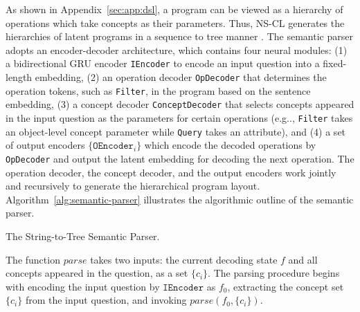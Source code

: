 \documentclass{article} %
\makeatletter
\DeclareRobustCommand\onedot{\futurelet\@let@token\@onedot}
\def\@onedot{\ifx\@let@token.\else.\null\fi\xspace}
\def\eg{e.g\onedot} \def\Eg{E.g\onedot}
\newcommand{\model}{NS-CL\xspace}
\makeatother
\begin{document}
As shown in Appendix~\ref{sec:app:dsl}, a program can be viewed as a hierarchy of operations which take concepts as their parameters. Thus, \model generates the hierarchies of latent programs in a sequence to tree manner \citep{Dong2016Language}. The semantic parser adopts an encoder-decoder architecture, which contains four neural modules: (1) a bidirectional GRU encoder {\tt IEncoder} \citep{Cho2014Learning} to encode an input question into a fixed-length embedding, (2) an operation decoder {\tt OpDecoder} that determines the operation tokens, such as {\tt Filter}, in the program based on the sentence embedding, (3) a concept decoder {\tt ConceptDecoder} that selects concepts appeared in the input question as the parameters for certain operations (\eg, {\tt Filter} takes an object-level concept parameter while {\tt Query} takes an attribute), and (4) a set of output encoders $\{\texttt{OEncoder}_i\}$ which encode the decoded operations by {\tt OpDecoder} and output the latent embedding for decoding the next operation. The operation decoder, the concept decoder, and the output encoders work jointly and recursively to generate the hierarchical program layout. Algorithm~\ref{alg:semantic-parser} illustrates the algorithmic outline of the semantic parser.

\begin{algorithm}[h]
\caption{The String-to-Tree Semantic Parser.}
\label{alg:semantic-parser}
\end{algorithm}

The function $parse$ takes two inputs: the current decoding state $f$ and all concepts appeared in the question, as a set $\{c_i\}$. The parsing procedure begins with encoding the input question by $\texttt{IEncoder}$ as $f_0$, extracting the concept set $\{c_i\}$ from the input question, and invoking $parse(f_0, \{c_i\})$.
\end{document}

